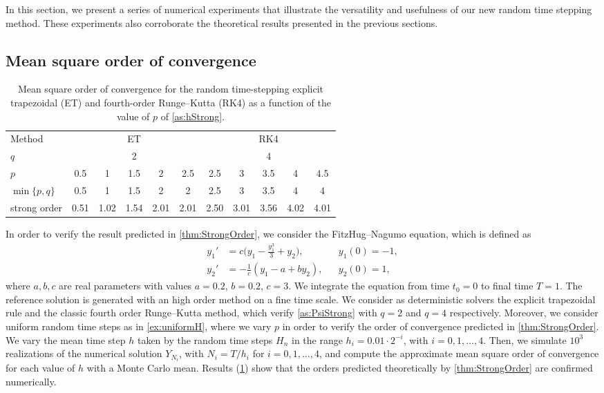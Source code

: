 \documentclass[10pt]{article}
\begin{document}
In this section, we present a series of numerical experiments that illustrate the versatility and usefulness of our new random time stepping method. These experiments also corroborate the theoretical results presented in the previous sections.

\subsection{Mean square order of convergence}

\begin{table}[!t]
	\centering
	\begin{tabular}{l|ccccc|ccccc}
		\toprule
		Method & \multicolumn{5}{c|}{ET} & \multicolumn{5}{c}{RK4} \\ 
		\cmidrule(l{2pt}r{2pt}){2-6} \cmidrule(l{2pt}r{2pt}){7-11} 
		$q$ & \multicolumn{5}{c|}{2} & \multicolumn{5}{c}{4} \\
		$p$ & 0.5 & 1 & 1.5 & 2 & 2.5 & 2.5 & 3 & 3.5 & 4 & 4.5\\
		$\min\{p,q\}$ & 0.5 & 1 & 1.5 & 2 & 2 & 2.5 & 3 & 3.5 & 4 & 4 \\
		strong order & 0.51 & 1.02 & 1.54 & 2.01 & 2.01 & 2.50 & 3.01 & 3.56 & 4.02 & 4.01 \\
		\bottomrule
	\end{tabular}
	\caption{Mean square order of convergence for the random time-stepping explicit trapezoidal (ET) and fourth-order Runge--Kutta (RK4) as a function of the value of $p$ of \cref{as:hStrong}.}
	\label{tab:NumericalResultsStrongOrder}
\end{table}

In order to verify the result predicted in \cref{thm:StrongOrder}, we consider the FitzHug--Nagumo equation, which is defined as
\begin{equation}\label{eq:FitzNag}
\begin{aligned}
y_1' &= c\big(y_1 - \frac{y_1^3}{3} + y_2\big), && y_1(0) = -1, \\
y_2' &= -\frac{1}{c}(y_1 - a + by_2), && y_2(0) = 1,
\end{aligned}
\end{equation}
where $a, b, c$ are real parameters with values $a = 0.2$, $b = 0.2$, $c = 3$. We integrate the equation from time $t_0 = 0$ to final time $T = 1$. The reference solution is generated with an high order method on a fine time scale. We consider as deterministic solvers the explicit trapezoidal rule and the classic fourth order Runge--Kutta method, which verify \cref{as:PsiStrong} with $q = 2$ and $q = 4$ respectively. Moreover, we consider uniform random time steps as in \cref{ex:uniformH}, where we vary $p$ in order to verify the order of convergence predicted in \cref{thm:StrongOrder}. We vary the mean time step $h$ taken by the random time steps $H_n$ in the range $h_i = 0.01\cdot 2^{-i}$, with $i = 0, 1, \ldots, 4$. Then, we simulate $10^3$ realizations of the numerical solution $Y_{N_i}$, with $N_i = T / h_i$ for $i = 0, 1, \ldots, 4$, and compute the approximate mean square order of convergence for each value of $h$ with a Monte Carlo mean. Results (\cref{tab:NumericalResultsStrongOrder}) show that the orders predicted theoretically by \cref{thm:StrongOrder} are confirmed numerically. 
\end{document}
